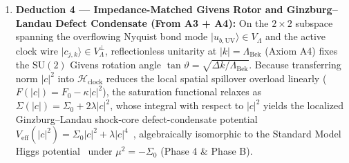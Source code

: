 \documentclass[11pt,a4paper]{article}
\theoremstyle{definition}
\begin{document}
\begin{enumerate}
\item \textbf{Deduction 4 --- Impedance-Matched Givens Rotor and Ginzburg--Landau Defect Condensate (From A3 + A4):} On the $2\times 2$ subspace spanning the overflowing Nyquist bond mode $|u_{b,\text{UV}}\rangle \in V_{\Lambda}$ and the active clock wire $|c_{j,k}\rangle \in V_{\Lambda}^{\perp}$, reflectionless unitarity at $|k| = \Lambda_{\text{Bek}}$ (Axiom A4) fixes the $\mathrm{SU}(2)$ Givens rotation angle $\tan\vartheta = \sqrt{\Delta k / \Lambda_{\text{Bek}}}$. Because transferring norm $|c|^2$ into $\mathcal{H}_{\text{clock}}$ reduces the local spatial spillover overload linearly ($F(|c|) = F_0 - \kappa |c|^2$), the saturation functional relaxes as $\Sigma(|c|) = \Sigma_0 + 2\lambda |c|^2$, whose integral with respect to $|c|^2$ yields the localized Ginzburg--Landau shock-core defect-condensate potential $V_{\text{eff}}(|c|^2) = \Sigma_0 |c|^2 + \lambda |c|^4$~\cite{ginzburg1950}, algebraically isomorphic to the Standard Model Higgs potential~\cite{higgs1964,lee1977} under $\mu^2 = -\Sigma_0$ (Phase 4 \& Phase B).
\end{enumerate}
\end{document}
